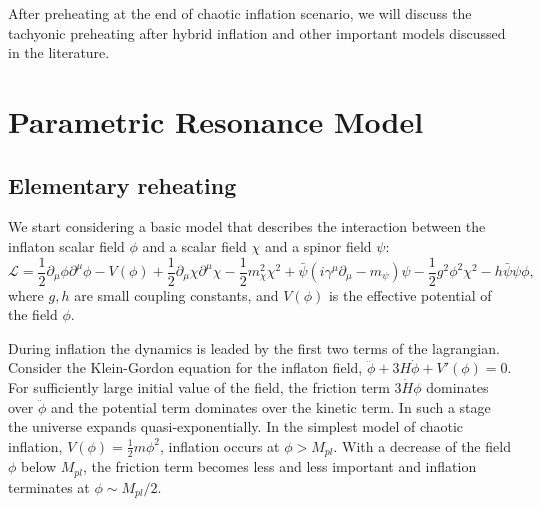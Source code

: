 \documentclass[11pt,a4paper,twoside]{book}
\begin{document}
After preheating at the end of chaotic inflation scenario, we will discuss the tachyonic preheating after hybrid inflation and other important models discussed in the literature.

\section{Parametric Resonance Model}

\subsection{Elementary reheating}
We start considering a basic model that describes the interaction between the inflaton scalar field $\phi$ and a scalar field 	$\chi$ and a spinor field $\psi$:
\begin{equation}
	\label{Chap4:ElementaryReheating_Lagrangian}
	\mathcal{L}=\frac{1}{2}\partial_{\mu}\phi\partial^{\mu}{\phi} - V(\phi) +\frac{1}{2}\partial_{\mu}\chi\partial^{\mu}\chi -\frac{1}{2}m^{2}_{\chi}\chi^{2} + \bar{\psi}(i\gamma^{\mu}\partial_{\mu} - m_{\psi})\psi - \frac{1}{2}g^{2}\phi^{2}\chi^{2} - h\bar{\psi}\psi \phi,
\end{equation} 
where $ g,h $ are small coupling constants, and $ V(\phi) $ is the effective potential of the field $\phi$. 

During inflation the dynamics is leaded by the first two terms of the lagrangian. Consider the Klein-Gordon equation  for the inflaton field, $ \ddot{\phi} + 3H\dot{\phi} + V'(\phi) = 0 $. For sufficiently large initial value of the field, the friction term $ 3\dot{H}\phi $ dominates over $\ddot{\phi}$ and the potential term dominates over the kinetic term. In such a stage the universe expands quasi-exponentially. In the simplest model of chaotic inflation, $ V(\phi)=\frac{1}{2}m\phi^{2} $, inflation occurs at $\phi > M_{pl}$. With a decrease of the field $ \phi $ below $ M_{pl} $, the friction term becomes less and less important and inflation terminates at $ \phi \sim M_{pl}/2 $.
\end{document}
